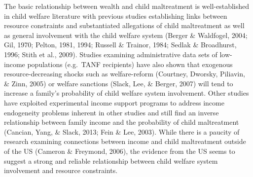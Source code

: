 \documentclass[review]{elsarticle}\usepackage[]{graphicx}\usepackage[]{color}
\begin{document}
The basic relationship between wealth and child maltreatment is
well-established in child welfare literature with previous studies
establishing links between resource constraints and substantiated
allegations of child maltreatment as well as general involvement with
the child welfare system (Berger \& Waldfogel, 2004; Gil, 1970;
Pelton, 1981, 1994; Russell \& Trainor, 1984; Sedlak \& Broadhurst,
1996; Stith et al., 2009). Studies examining administrative data sets of
low-income populations (e.g.~TANF recipients) have also shown that
exogenous resource-decreasing shocks such as welfare-reform (Courtney,
Dworsky, Piliavin, \& Zinn, 2005) or welfare sanctions (Slack, Lee, \&
Berger, 2007) will tend to increase a family's probability of child
welfare system involvement. Other studies have exploited experimental
income support programs to address income endogeneity problems inherent
in other studies and still find an inverse relationship between family
income and the probability of child maltreatment (Cancian, Yang, \&
Slack, 2013; Fein \& Lee, 2003). While there is a paucity of research
examining connections between income and child maltreatment outside of
the US (Cameron \& Freymond, 2006), the evidence from the US seems to
suggest a strong and reliable relationship between child welfare system
involvement and resource constraints.
\end{document}
